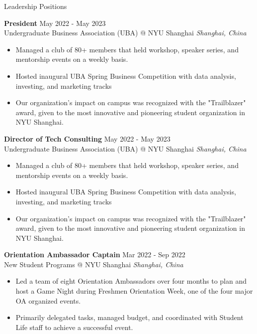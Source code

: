 \documentclass{cv} %
\begin{document}
\begin{rSection}{Leadership Positions}

	\textbf{President} \hfill May 2022 - May 2023 \\
	Undergraduate Business Association (UBA) @ NYU Shanghai \hfill \textit{Shanghai, China}
	\begin{itemize}
		\item Managed a club of 80+ members that held workshop, speaker series, and mentorship events on a weekly basis.
		\item Hosted inaugural UBA Spring Business Competition with data analysis, investing, and marketing tracks
		\item Our organization's impact on campus was recognized with the "Trailblazer" award, given to the most innovative and pioneering student organization in NYU Shanghai.
	\end{itemize}

	\textbf{Director of Tech Consulting} \hfill May 2022 - May 2023 \\
	Undergraduate Business Association (UBA) @ NYU Shanghai \hfill \textit{Shanghai, China}
	\begin{itemize}
		\item Managed a club of 80+ members that held workshop, speaker series, and mentorship events on a weekly basis.
		\item Hosted inaugural UBA Spring Business Competition with data analysis, investing, and marketing tracks
		\item Our organization's impact on campus was recognized with the "Trailblazer" award, given to the most innovative and pioneering student organization in NYU Shanghai.
	\end{itemize}

	\textbf{Orientation Ambassador Captain} \hfill Mar 2022 - Sep 2022 \\
	New Student Programs @ NYU Shanghai \hfill \textit{Shanghai, China}
	\begin{itemize}
		\item Led a team of eight Orientation Ambassadors over four months to plan and host a Game Night during Freshmen Orientation Week, one of the four major OA organized events.
		\item Primarily delegated tasks, managed budget, and coordinated with Student Life staff to achieve a successful event.
	\end{itemize}


\end{rSection}
\end{document}
